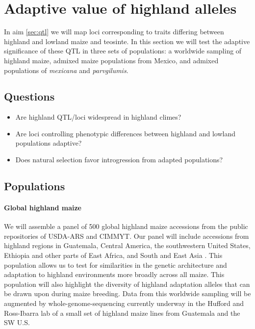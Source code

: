 \section{Adaptive value of highland alleles} \label{sec:popgen}

In aim \ref{sec:qtl} we will map loci corresponding to traits differing between highland and lowland maize and teosinte. In this section we will test the adaptive significance of these QTL in three sets of populations: a worldwide sampling of highland maize, admixed maize populations from Mexico, and admixed populations of \emph{mexicana} and \emph{parvgilumis}. 

\subsection*{Questions}
\begin{itemize}[topsep=0pt,itemsep=-1ex,partopsep=1ex,parsep=1ex]
\item Are highland QTL/loci widespread in highland climes?
\item Are loci controlling phenotypic differences between highland and lowland populations adaptive?
\item Does natural selection favor introgression from adapted populations?
\end{itemize}

\subsection{Populations}

\paragraph{Global highland maize} 
We will assemble a panel of 500 global highland maize accessions from the public repositories of USDA-ARS and CIMMYT.  Our panel will include accessions from highland regions in Guatemala, Central America, the southwestern United States, Ethiopia and other parts of East Africa, and South and East Asia \citep{bjarnason1994subtropical}. This population allows us to test for similarities in the genetic architecture and adaptation to highland environments more broadly across all maize.  This population will also highlight the diversity of highland adaptation alleles that can be drawn upon during maize breeding.  Data from this worldwide sampling will be augmented by whole-genome-sequencing currently underway in the Hufford and Ross-Ibarra lab of a small set of highland maize lines from Guatemala and the SW U.S.

